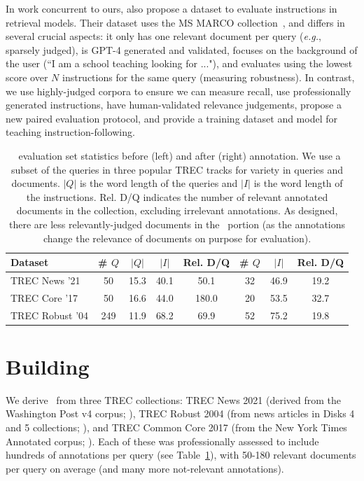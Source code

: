 \documentclass{article} %
\begin{document}
In work concurrent to ours, \cite{oh2024instructir} also propose a dataset to evaluate instructions in retrieval models. Their dataset uses the MS MARCO collection~\citep{msmarco}, and differs in several crucial aspects: it only has one relevant document per query (\textit{e.g.}, sparsely judged), is GPT-4 generated and validated, focuses on the background of the user (``I am a school teaching looking for ..."), and evaluates using the lowest score over $N$ instructions for the same query (measuring robustness). In contrast, we use highly-judged corpora to ensure we can measure recall, use professionally generated instructions, have human-validated relevance judgements, propose a new paired evaluation protocol, and provide a training dataset and model for teaching instruction-following. 

\begin{table}[t!]
\centering
\small
\begin{tabular}{l|cccc|ccc}
\toprule
Dataset & \# $Q$ & $|Q|$ & $|I|$ & Rel. D/Q & \# $Q$ & $|I|$ & Rel. D/Q \\
\midrule
TREC News '21 \citep{soboroff2020trec} & 50 & 15.3 & 40.1 & 50.1 & 32 & 46.9 & 19.2 \\
TREC Core '17 \citep{allan2017trec} & 50 & 16.6 & 44.0 & 180.0 & 20 &  53.5 & 32.7 \\
TREC Robust '04 \citep{voorhees2005trec} & 249 & 11.9 & 68.2 & 69.9 & 52 & 75.2 & 19.8 \\
\bottomrule
\end{tabular}
\caption{\dataset\ evaluation set statistics before (left) and after (right) annotation. We use a subset of the queries in three popular TREC tracks for variety in queries and documents. \textit{$|Q|$} is the word length of the queries and \textit{$|I|$} is the word length of the instructions. Rel. D/Q indicates the number of relevant annotated documents in the collection, excluding irrelevant annotations. As designed, there are less relevantly-judged documents in the \dataset\ portion (as the annotations change the relevance of documents on purpose for evaluation).
}
\label{tab:statistics}
\end{table}

\section{Building \dataset}
We derive \dataset\ from three TREC collections: TREC News 2021 (derived from the Washington Post v4 corpus; \citealp{soboroff2020trec}), TREC Robust 2004 (from news articles in Disks 4 and 5 collections; \citealp{voorhees2005trec}), and TREC Common Core 2017 (from the New York Times Annotated corpus; \citealp{allan2017trec}). 
Each of these was professionally assessed to include hundreds of annotations per query (see Table~\ref{tab:statistics}), with 50-180 relevant documents per query on average (and many more not-relevant annotations).
\end{document}
